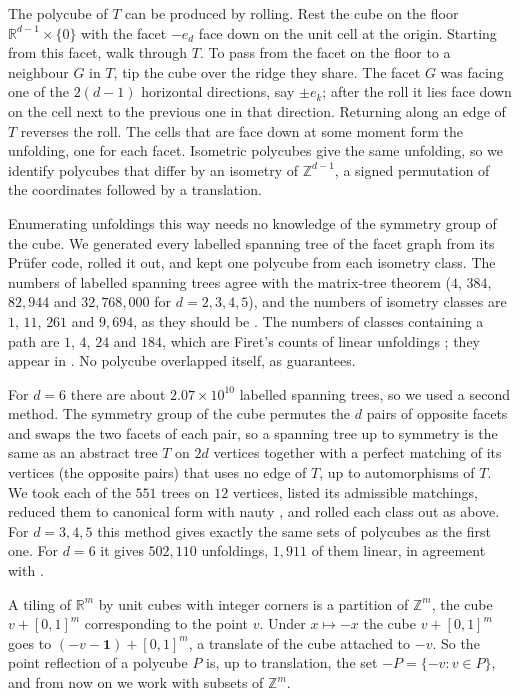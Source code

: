 \documentclass[11pt]{amsart}
\theoremstyle{definition}
\theoremstyle{remark}
\newcommand{\Z}{\mathbb{Z}}
\newcommand{\R}{\mathbb{R}}
\begin{document}
The polycube of $T$ can be produced by rolling. Rest the cube on the floor $\R^{d-1}\times\{0\}$ with the facet $-e_d$ face down on the unit cell at the origin. Starting from this facet, walk through $T$. To pass from the facet on the floor to a neighbour $G$ in $T$, tip the cube over the ridge they share. The facet $G$ was facing one of the $2(d-1)$ horizontal directions, say $\pm e_k$; after the roll it lies face down on the cell next to the previous one in that direction. Returning along an edge of $T$ reverses the roll. The cells that are face down at some moment form the unfolding, one for each facet. Isometric polycubes give the same unfolding, so we identify polycubes that differ by an isometry of $\Z^{d-1}$, a signed permutation of the coordinates followed by a translation.

Enumerating unfoldings this way needs no knowledge of the symmetry group of the cube. We generated every labelled spanning tree of the facet graph from its Pr\"ufer code, rolled it out, and kept one polycube from each isometry class. The numbers of labelled spanning trees agree with the matrix-tree theorem ($4$, $384$, $82{,}944$ and $32{,}768{,}000$ for $d=2,3,4,5$), and the numbers of isometry classes are $1$, $11$, $261$ and $9{,}694$, as they should be \cite{OEIS91159}. The numbers of classes containing a path are $1$, $4$, $24$ and $184$, which are Firet's counts of linear unfoldings \cite{Firet}; they appear in \cite{OEIS271215}. No polycube overlapped itself, as \cite{DDRW} guarantees.

For $d=6$ there are about $2.07\times10^{10}$ labelled spanning trees, so we used a second method. The symmetry group of the cube permutes the $d$ pairs of opposite facets and swaps the two facets of each pair, so a spanning tree up to symmetry is the same as an abstract tree $T$ on $2d$ vertices together with a perfect matching of its vertices (the opposite pairs) that uses no edge of $T$, up to automorphisms of $T$. We took each of the $551$ trees on $12$ vertices, listed its admissible matchings, reduced them to canonical form with nauty \cite{nauty}, and rolled each class out as above. For $d=3,4,5$ this method gives exactly the same sets of polycubes as the first one. For $d=6$ it gives $502{,}110$ unfoldings, $1{,}911$ of them linear, in agreement with \cite{OEIS91159,OEIS271215}.

A tiling of $\R^{m}$ by unit cubes with integer corners is a partition of $\Z^m$, the cube $v+[0,1]^m$ corresponding to the point $v$. Under $x\mapsto -x$ the cube $v+[0,1]^m$ goes to $(-v-\mathbf 1)+[0,1]^m$, a translate of the cube attached to $-v$. So the point reflection of a polycube $P$ is, up to translation, the set $-P=\{-v: v\in P\}$, and from now on we work with subsets of $\Z^m$.
\end{document}
